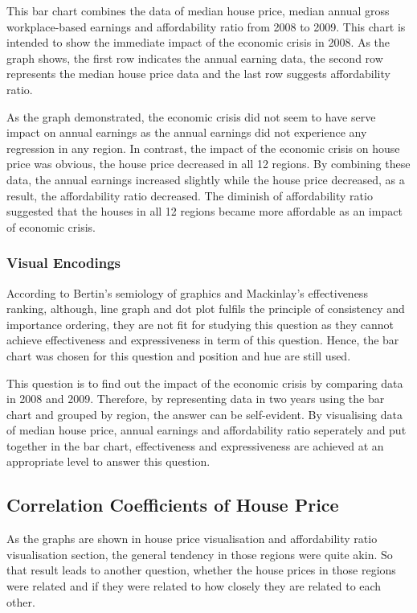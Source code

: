 \documentclass{article}
\begin{document}
This bar chart combines the data of median house price, median annual gross workplace-based earnings and affordability ratio from 2008 to 2009. This chart is intended to show the immediate impact of the economic crisis in 2008. As the graph shows, the first row indicates the annual earning data, the second row represents the median house price data and the last row suggests affordability ratio. 

As the graph demonstrated, the economic crisis did not seem to have serve impact on annual earnings as the annual earnings did not experience any regression in any region. In contrast, the impact of the economic crisis on house price was obvious, the house price decreased in all 12 regions. By combining these data, the annual earnings increased slightly while the house price decreased, as a result, the affordability ratio decreased. The diminish of affordability ratio suggested that the houses in all 12 regions became more affordable as an impact of economic crisis. 

\subsubsection{Visual Encodings}
According to Bertin's semiology of graphics and Mackinlay's effectiveness ranking, although, line graph and 
dot plot fulfils the principle of consistency and importance ordering, they are not fit for studying this question 
as they cannot achieve effectiveness and expressiveness in term of this question. Hence, the bar chart was 
chosen for this question and position and hue are still used.

This question is to find out the impact of the economic crisis by comparing data in 2008 and 2009. Therefore, by representing data in two years using the bar chart and grouped by region, the answer can be self-evident. 
By visualising data of median house price, annual earnings and affordability ratio seperately and put 
together in the bar chart, effectiveness and expressiveness are achieved at an appropriate level to answer
this question.


\subsection{Correlation Coefficients of House Price}
As the graphs are shown in house price visualisation and affordability ratio visualisation section, the general tendency in those regions were quite akin. So that result leads to another question, whether the house prices in those regions were related and if they were related to how closely they are related to each other.
\end{document}
